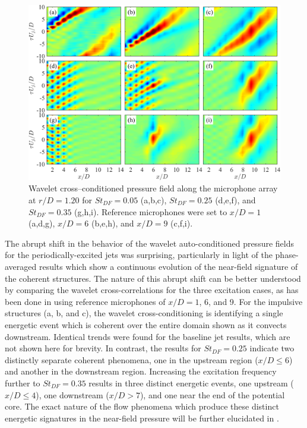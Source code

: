 \begin{figure}
	\centering
	\includegraphics[width=\textwidth]{Figures/wavelet_cross_conditioning.png}
	\caption{Wavelet cross--conditioned pressure field along the microphone array at $r/D = 1.20$ for $St_{DF} = 0.05$ (a,b,c), $St_{DF} = 0.25$ (d,e,f), and $St_{DF} = 0.35$ (g,h,i). Reference microphones were set to $x/D = 1$ (a,d,g), $x/D = 6$ (b,e,h), and $x/D = 9$ (c,f,i).}
	\label{fig:WaveCrossCond}
\end{figure}
The abrupt shift in the behavior of the wavelet auto-conditioned pressure fields for the periodically-excited jets was surprising, particularly in light of the phase-averaged results which show a continuous evolution of the near-field signature of the coherent structures. 
The nature of this abrupt shift can be better understood by comparing the wavelet cross-correlations for the three excitation cases, as has been done in  using reference microphones of $x/D = 1$, 6, and 9.
For the impulsive structures (a, b, and c), the wavelet cross-conditioning is identifying a single energetic event which is coherent over the entire domain shown as it convects downstream.
Identical trends were found for the baseline jet results, which are not shown here for brevity.
In contrast, the results for $St_{DF} = 0.25$ indicate two distinctly separate coherent phenomena, one in the upstream region ($x/D \leq 6$) and another in the downstream region.
Increasing the excitation frequency further to $St_{DF} = 0.35$ results in three distinct energetic events, one upstream ($x/D \leq 4$), one downstream ($x/D > 7$), and one near the end of the potential core.
The exact nature of the flow phenomena which produce these distinct energetic signatures in the near-field pressure will be further elucidated in .

